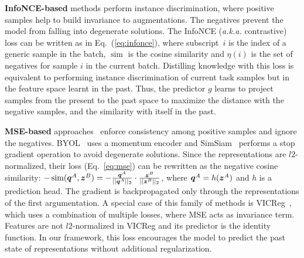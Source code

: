 \noindent\textbf{InfoNCE-based} methods \cite{chen2020simple, he2020momentum} perform instance discrimination, where positive samples help to build invariance to augmentations. The negatives prevent the model from falling into degenerate solutions. The InfoNCE (\textit{a.k.a.} contrastive) loss can be written as in Eq.~(\ref{eq:infonce}), where subscript~$i$ is the index of a generic sample in the batch, $\operatorname{sim}$ is the cosine similarity and $\eta(i)$ is the set of negatives for sample $i$ in the current batch. 
Distilling knowledge with this loss is equivalent to performing instance discrimination of current task samples but in the feature space learnt in the past. Thus, the predictor $g$ learns to project samples from the present to the past space to maximize the distance with the negative samples, and the similarity with itself in the past.

\noindent\textbf{MSE-based} approaches~\cite{grill2020bootstrap, chen2021exploring} enforce consistency among positive samples and ignore the negatives. BYOL~\cite{grill2020bootstrap} uses a momentum encoder and SimSiam~\cite{chen2021exploring} performs a stop gradient operation to avoid degenerate solutions. Since the representations are $l2$-normalized, their loss (Eq.~\ref{eq:mse}) can be rewritten as the negative cosine similarity:  $-\operatorname{sim}(\boldsymbol{q}^A, \boldsymbol{z}^B) =-\frac{\boldsymbol{q}^A}{||\boldsymbol{q}^A||_2}\cdot\frac{\boldsymbol{z}^B}{||\boldsymbol{z}^B||_2}$,
where $\boldsymbol{q}^A = h(\boldsymbol{z}^A)$ and $h$ is a prediction head. The gradient is backpropagated only through the representations of the first argumentation. A special case of this family of methods is VICReg~\cite{bardes2021vicreg}, which uses a combination of multiple losses, where MSE acts as invariance term. Features are not $l2$-normalized in VICReg and its predictor is the identity function. In our framework, this loss encourages the model to predict the past state of representations without additional regularization.

